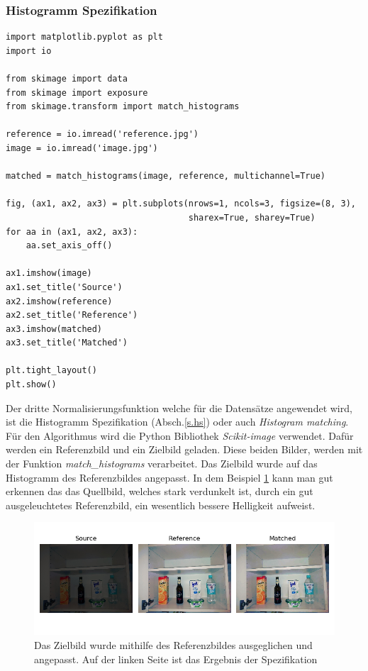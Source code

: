 \documentclass[a4paper,12pt,oneside]{article}
\begin{document}
\subsubsection{Histogramm Spezifikation}
\begin{lstlisting}
import matplotlib.pyplot as plt
import io

from skimage import data
from skimage import exposure
from skimage.transform import match_histograms

reference = io.imread('reference.jpg')
image = io.imread('image.jpg')

matched = match_histograms(image, reference, multichannel=True)

fig, (ax1, ax2, ax3) = plt.subplots(nrows=1, ncols=3, figsize=(8, 3),
                                    sharex=True, sharey=True)
for aa in (ax1, ax2, ax3):
    aa.set_axis_off()

ax1.imshow(image)
ax1.set_title('Source')
ax2.imshow(reference)
ax2.set_title('Reference')
ax3.imshow(matched)
ax3.set_title('Matched')

plt.tight_layout()
plt.show()
\end{lstlisting}
Der dritte Normalisierungsfunktion welche für die Datensätze angewendet wird, ist die Histogramm Spezifikation (Absch.\ref{s.hs}) oder auch \textit{Histogram matching}. Für den Algorithmus wird die Python Bibliothek \textit{Scikit-image} verwendet. Dafür werden ein Referenzbild und ein Zielbild geladen. Diese beiden Bilder, werden mit der Funktion \textit{match\_histograms} verarbeitet. Das Zielbild wurde auf das Histogramm des Referenzbildes angepasst. In dem Beispiel \ref{img:histogramspez} kann man gut erkennen das das Quellbild, welches stark verdunkelt ist, durch ein gut ausgeleuchtetes Referenzbild, ein wesentlich bessere Helligkeit aufweist.
\begin{figure}
	[h]
	\centering
	\includegraphics[scale=0.8]{Sources/HS_beispiel.png}
	\caption{Das Zielbild wurde mithilfe des Referenzbildes ausgeglichen und angepasst. Auf der linken Seite ist das Ergebnis der Spezifikation}
	\label{img:histogramspez}
\end{figure}
  \newpage
\end{document}
